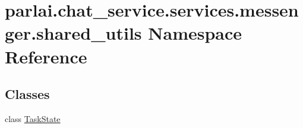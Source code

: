 \hypertarget{namespaceparlai_1_1chat__service_1_1services_1_1messenger_1_1shared__utils}{}\section{parlai.\+chat\+\_\+service.\+services.\+messenger.\+shared\+\_\+utils Namespace Reference}
\label{namespaceparlai_1_1chat__service_1_1services_1_1messenger_1_1shared__utils}
\subsection*{Classes}
\begin{DoxyCompactItemize}
\item 
class \hyperlink{classparlai_1_1chat__service_1_1services_1_1messenger_1_1shared__utils_1_1TaskState}{Task\+State}
\end{DoxyCompactItemize}
